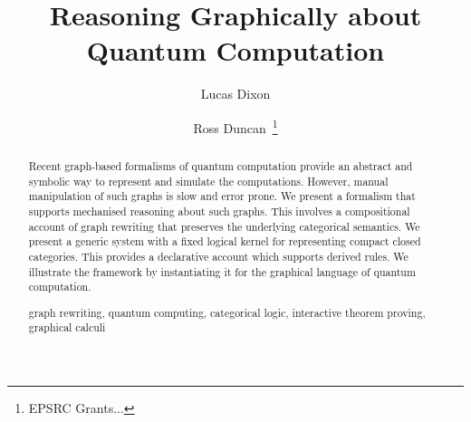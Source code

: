 \documentclass[runningheads]{llncs}
\newcommand{\keywords}[1]{\par\addvspace\baselineskip
\noindent\keywordname\enspace\ignorespaces#1}
\begin{document}
\mainmatter  %

\title{Reasoning Graphically about Quantum Computation}


%
%
\author{Lucas Dixon \and Ross Duncan~\thanks{EPSRC Grants...}%
}
%


%
%
\maketitle


\begin{abstract}
  Recent graph-based formalisms of quantum computation provide an
  abstract and symbolic way to represent and simulate the
  computations. However, manual manipulation of such graphs is slow
  and error prone. We present a formalism that supports mechanised
  reasoning about such graphs. This involves a compositional account
  of graph rewriting that preserves the underlying categorical
  semantics. We present a generic system with a fixed logical kernel
  for representing compact closed categories. This provides a
  declarative account which supports derived rules. We illustrate the
  framework by instantiating it for the graphical language of quantum
  computation. 

  \keywords{graph rewriting, quantum computing, categorical
    logic, interactive theorem proving, graphical calculi}
\end{abstract}
\end{document}
